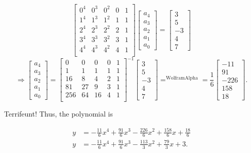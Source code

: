\documentclass[../gatm_answers.tex]{subfiles}
\begin{document}
$$\begin{bmatrix}
0^4 & 0^3 & 0^2 & 0 & 1 \\
1^4 & 1^3 & 1^2 & 1 & 1 \\
2^4 & 2^3 & 2^2 & 2 & 1 \\
3^4 & 3^3 & 3^2 & 3 & 1 \\
4^4 & 4^3 & 4^2 & 4 & 1 \\
\end{bmatrix} \begin{bmatrix}
a_4 \\ a_3 \\ a_2 \\ a_1 \\ a_0
\end{bmatrix} = \begin{bmatrix}
3 \\ 5 \\ -3 \\ 4 \\ 7
\end{bmatrix}$$
$$\Longrightarrow \begin{bmatrix}
a_4 \\ a_3 \\ a_2 \\ a_1 \\ a_0
\end{bmatrix} = \begin{bmatrix}
0 & 0 & 0 & 0 & 1 \\
1 & 1 & 1 & 1 & 1 \\
16 & 8 & 4 & 2 & 1 \\
81 & 27 & 9 & 3 & 1 \\
256 & 64 & 16 & 4 & 1 \\
\end{bmatrix}^{-1} \begin{bmatrix}
3 \\ 5 \\ -3 \\ 4 \\ 7
\end{bmatrix} \mathop{=}^{\text{WolframAlpha}} =
\frac{1}{6} \begin{bmatrix}
-11 \\ 91 \\ -226 \\ 158 \\ 18
\end{bmatrix}.$$

Terrifeunt! Thus, the polynomial is

\begin{align*}
y &= -\frac{11}{6}x^4 + \frac{91}{6}x^3 - \frac{226}{6}x^2 + \frac{158}{6}x + \frac{18}{6} \\
y &= -\frac{11}{6}x^4 + \frac{91}{6}x^3 - \frac{113}{3}x^2 + \frac{79}{3}x + 3.
\end{align*}
\end{document}
